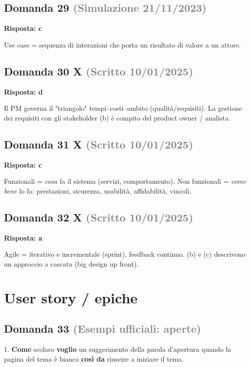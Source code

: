 \documentclass[a4paper,11pt]{article}
\begin{document}
\subsection*{Domanda 29 \hfill {\small \textcolor{gray}{(Simulazione 21/11/2023)}}}
\textbf{Risposta: c}\par
Use case = sequenza di interazioni che porta un risultato di valore a un attore.



\subsection*{Domanda 30 X \hfill {\small \textcolor{gray}{(Scritto 10/01/2025)}}}
\textbf{Risposta: d}\par
Il PM governa il "triangolo" tempi–costi–ambito (qualità/requisiti). La gestione dei requisiti con gli stakeholder (b) è compito del product owner / analista.



\subsection*{Domanda 31 X \hfill {\small \textcolor{gray}{(Scritto 10/01/2025)}}}
\textbf{Risposta: c}\par
Funzionali = \textit{cosa} fa il sistema (servizi, comportamento). Non funzionali = \textit{come bene} lo fa: prestazioni, sicurezza, usabilità, affidabilità, vincoli.



\subsection*{Domanda 32 X \hfill {\small \textcolor{gray}{(Scritto 10/01/2025)}}}
\textbf{Risposta: a}\par
Agile = iterativo e incrementale (sprint), feedback continuo. (b) e (c) descrivono un approccio a cascata (big design up front).



\section{User story / epiche}

\subsection*{Domanda 33 \hfill {\small \textcolor{gray}{(Esempi ufficiali: aperte)}}}
1. \textbf{Come} scolaro \textbf{voglio} un suggerimento della parola d'apertura quando la pagina del tema è bianca \textbf{così da} riuscire a iniziare il tema.
\end{document}
